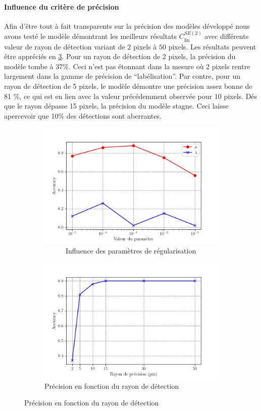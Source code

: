 \documentclass{article}
\begin{document}
\paragraph{Influence du critère de précision}
Afin d'être tout à fait transparents sur la précision des modèles développé nous avons testé le modèle démontrant les meilleurs 
résultats $C_{\text{lin}}^{SE(2)}$ avec différents valeur de rayon de détection variant de $2$ pixels à $50$ pixels. Les résultats 
peuvent être appréciés en \ref{fig:radius}. Pour un rayon de détection de 2 pixels, la précision du modèle tombe à $37 \%$. Ceci n'est pas 
étonnant dans la mesure où 2 pixels rentre largement dans la gamme de précision de ``labélisation''. Par contre, pour un rayon de détection de 5 pixels, 
le modèle démontre une précision assez bonne de 81 \%, ce qui est en lien avec la valeur précédemment observée pour 10 pixels. Dés que le rayon dépasse 
15 pixels, la précision du modèle stagne. Ceci laisse apercevoir que 10\% des détections sont aberrantes.

\begin{figure}[htpb]
\centering
\hspace*{-5em}%
\begin{subfigure}{.6\textwidth}
\includegraphics[scale=0.65]{plots/parameter_score_C_D_lin_R2.jpg}%
  \caption{$ \quad \quad \quad $Influence des paramètres de régularisation}%
    \label{fig:param}
\end{subfigure}%
\begin{subfigure}{.6\textwidth}
  \includegraphics[scale=0.65]{plots/radius_scores.jpg}
  \caption{ Précision en fonction du rayon de détection}%
  \label{fig:radius}
\end{subfigure}
\end{figure}
\end{document}
